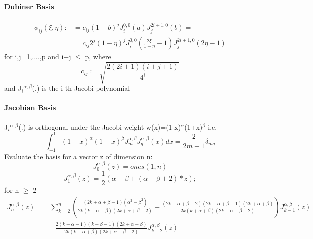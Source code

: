\documentclass[a4paper]{article}
\theoremstyle{definition}
\begin{document}
\paragraph{Dubiner Basis}
	\begin{equation}
	\begin{split}
	\phi_{ij}(\xi,\eta) :&= c_{ij}(1-b)^j J_i^{0,0}(a) J_j^{2i+1,0}(b)=
	\\&=c_{ij} 2^j (1-\eta)^j J_i^{0,0}(\frac{2\xi}{1-\eta}-1) J_j^{2i+1,0} (2\eta-1)
	\end{split}
	\end{equation}
	for i,j=1,....,p and i+j $\le$ p, where
	\begin{equation}
	c_{ij} := \sqrt{\frac{2(2i+1)(i+j+1)}{4^i}}
	\end{equation}
	and J$_i$$^{\alpha,\beta}$(.) is the i-th Jacobi polynomial
\paragraph{Jacobian Basis}
	J$_i$$^{\alpha,\beta}$(.) is orthogonal under the Jacobi weight w(x)=(1-x)$^\alpha$(1+x)$^\beta$ i.e. 
	\begin{equation} 
	\int_{-1}^{1}{(1-x)^\alpha(1+x)^\beta J_m^{\alpha,\beta} J_q^{\alpha,\beta}(x)dx}=\frac{2}{2m+1} \delta_{mq} 
	\end{equation}
	Evaluate the basis for a vector z of dimension n:
	\begin{equation}
	J_0^{\alpha,\beta}(z)=ones(1,n)
	\end{equation}
	\begin{equation}
	J_1^{\alpha,\beta}(z)=\frac{1}{2}(\alpha-\beta+(\alpha+\beta+2)*z);
	\end{equation}
	for n $\ge$ 2
	\newline
	\begin{equation}
	\begin{split}
	J_n^{\alpha,\beta}(z)=&\sum_{k=2}^{n} (\frac{(2k+\alpha+\beta-1)(\alpha^{2}-\beta^{2})}{2k(k+\alpha+\beta)(2k+\alpha+\beta-2)}+\frac{(2k+\alpha+\beta-2)(2k+\alpha+\beta-1)(2k+\alpha+\beta)}{2k(k+\alpha+\beta)(2k+\alpha+\beta-2)}) J_{k-1}^{\alpha,\beta}(z)
	\\&-\frac{2(k+\alpha-1)(k+\beta-1)(2k+\alpha+\beta)}{2k(k+\alpha+\beta)(2k+\alpha+\beta-2)} J_{k-2}^{\alpha,\beta}(z)
	\end{split}
	\end{equation}
\end{document}
